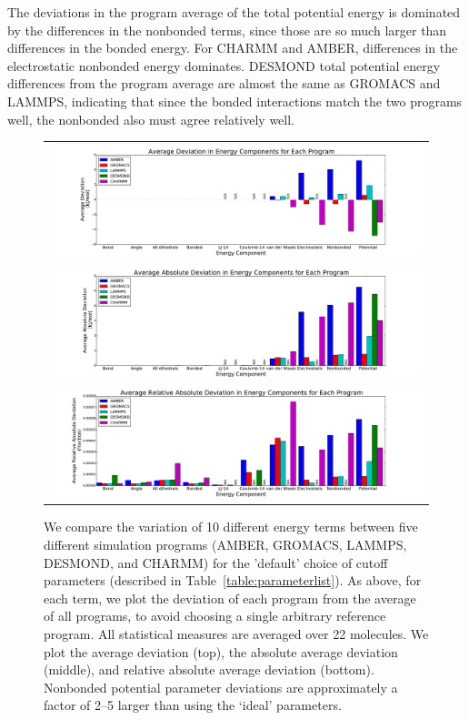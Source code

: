 The deviations in the program average of the total potential energy is
dominated by the differences in the nonbonded terms, since those are
so much larger than differences in the bonded energy.  For CHARMM and
AMBER, differences in the electrostatic nonbonded energy
dominates. DESMOND total potential energy differences from the
program average are almost the same as GROMACS and LAMMPS, indicating
that since the bonded interactions match the two programs well, the
nonbonded also must agree relatively well.

\begin{figure}[h]
\begin{tabular}{c}
\includegraphics[width=\textwidth]{AverageDefaultSettings.pdf} \\  
\includegraphics[width=\textwidth]{AverageAbsoluteDefaultSettings.pdf} \\  
\includegraphics[width=\textwidth]{AverageRelativeAbsoluteDefaultSettings.pdf}
\end{tabular}
\caption{We compare the variation of 10 different energy terms between
  five different simulation programs (AMBER, GROMACS, LAMMPS, DESMOND,
  and CHARMM) for the 'default' choice of cutoff parameters (described
  in Table~\ref{table:parameterlist}). As above, for each term, we plot the deviation of each
  program from the average of all programs, to avoid choosing a single
  arbitrary reference program. All statistical measures are averaged over 22
  molecules. We plot the average deviation (top), the absolute average
  deviation (middle), and relative absolute average deviation
  (bottom). Nonbonded potential parameter deviations are approximately a
  factor of 2--5 larger than using the `ideal' parameters.
\label{fig:defaultfig}}
\end{figure}

